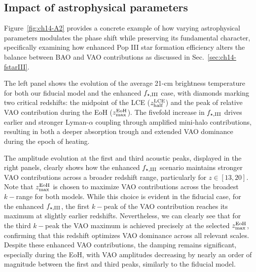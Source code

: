 \begin{subappendices}
\subsection{ Impact of astrophysical parameters}
\noindent Figure~\ref{fig:ch14-A2} provides a concrete example of how varying astrophysical parameters modulates the phase shift while preserving its fundamental character, specifically examining how enhanced Pop III star formation efficiency alters the balance between BAO and VAO contributions as discussed in Sec.~\ref{sec:ch14-fstarIII}.

The left panel shows the evolution of the average 21-cm brightness temperature for both our fiducial model and the enhanced $f_{\star,\rm III}$ case, with diamonds marking two critical redshifts: the midpoint of the LCE ($z_{\rm half}^{\rm LCE}$) and the peak of relative VAO contribution during the EoH ($z_{\rm max}^{\rm EoH}$). The fivefold increase in $f_{\star,\rm III}$ drives earlier and stronger Lyman-$\alpha$ coupling through amplified mini-halo contributions, resulting in both a deeper absorption trough and extended VAO dominance during the epoch of heating.

The amplitude evolution at the first and third acoustic peaks, displayed in the right panels, clearly shows how the enhanced $f_{\star,\rm III}$ scenario maintains stronger VAO contributions across a broader redshift range, particularly for $z\in [13,20]$.  Note that $z_{\rm max}^{\rm EoH}$ is chosen to maximize VAO contributions across the broadest $k-$range for both models. While this choice is evident in the fiducial case, for the enhanced $f_{\star,\rm III}$, the first $k-$peak of the VAO contribution reaches its maximum at slightly earlier redshifts. Nevertheless, we can clearly see that for the third $k-$peak the VAO maximum is achieved precisely at the selected $z_{\rm max}^{\rm EoH}$, confirming that this redshift optimizes VAO dominance across all relevant scales. Despite these enhanced VAO contributions, the damping remains significant, especially during the EoH, with VAO amplitudes decreasing by nearly an order of magnitude between the first and third peaks, similarly to the fiducial model.

\end{subappendices}
